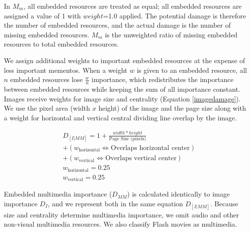 In $M_m$, all embedded resources are treated as equal; all embedded resources are assigned a value of 1 with $weight$=1.0 applied. The potential damage is therefore the number of embedded resources, and the actual damage is the number of missing embedded resources. $M_m$ is the unweighted ratio of missing embedded resources to total embedded resources.

We assign additional weights to important embedded resources at the expense of less important mementos. When a weight $w$ is given to an embedded resource, all $n$ embedded resources lose $\frac{w}{n}$ importance, which redistributes the importance between embedded resources while keeping the sum of all importance constant. Images receive weights for image size and centrality (Equation \ref{imagedamage}). We use the pixel area (width $x$ height) of the image and the page size along with a weight for horizontal and vertical central dividing line overlap by the image.

\begin{equation}
\label{imagedamage}
\begin{split}
&D_{[I|MM]} = 1 + \frac{width * height}{\text{Page Size (pixels)}}\\ &+ (w_{\text{horizontal}} \iff \text{Overlaps horizontal center})\\
&+ (w_{\text{vertical}} \iff \text{Overlaps vertical center})\\
&w_{\text{horizontal}} = 0.25\\
&w_{\text{vertical}} = 0.25
\end{split}
\end{equation}


Embedded multimedia importance ($D_{MM}$) is calculated identically to image importance $D_I$, and we represent both in the same equation $D_{[I|MM]}$. Because size and centrality determine multimedia importance, we omit audio and other non-visual multimedia resources. We also classify Flash movies as multimedia.



